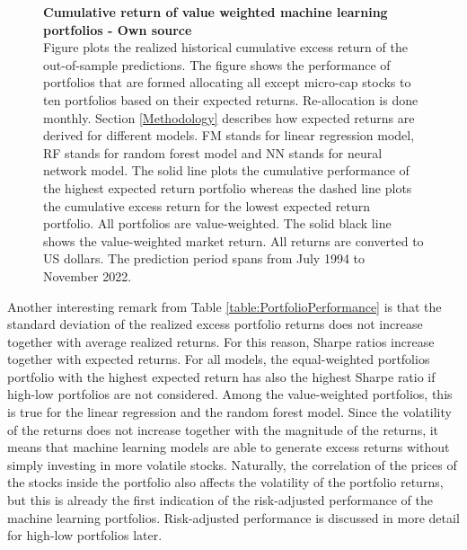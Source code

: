 \documentclass[12pt]{article}
\begin{document}
\begin{figure}[ht]
\centering
\caption[Cumulative return of value weighted machine learning portfolios]{\textbf{Cumulative return of value weighted machine learning portfolios \textnormal{- Own source}}\\ Figure plots the realized historical cumulative excess return of the out-of-sample predictions. The figure shows the performance of portfolios that are formed allocating all except micro-cap stocks to ten portfolios based on their expected returns. Re-allocation is done monthly. Section \ref{Methodology} describes how expected returns are derived for different models. FM stands for linear regression model, RF stands for random forest model and NN stands for neural network model. The solid line plots the cumulative performance of the highest expected return portfolio whereas the dashed line plots the cumulative excess return for the lowest expected return portfolio. All portfolios are value-weighted. The solid black line shows the value-weighted market return. All returns are converted to US dollars. The prediction period spans from July 1994 to November 2022.}

\label{plot:cumul_vw_portf_return}
\end{figure}

Another interesting remark from Table \ref{table:PortfolioPerformance} is that the standard deviation of the realized excess portfolio returns does not increase together with average realized returns. For this reason, Sharpe ratios increase together with expected returns. For all models, the equal-weighted portfolios portfolio with the highest expected return has also the highest Sharpe ratio if high-low portfolios are not considered. Among the value-weighted portfolios, this is true for the linear regression and the random forest model. Since the volatility of the returns does not increase together with the magnitude of the returns, it means that machine learning models are able to generate excess returns without simply investing in more volatile stocks. Naturally, the correlation of the prices of the stocks inside the portfolio also affects the volatility of the portfolio returns, but this is already the first indication of the risk-adjusted performance of the machine learning portfolios. Risk-adjusted performance is discussed in more detail for high-low portfolios later. \par
\end{document}
